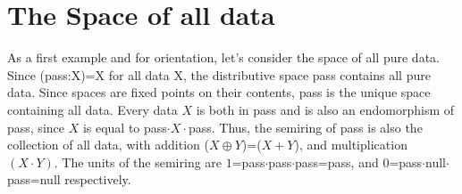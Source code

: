 \documentclass[11pt]{article}
\begin{document}
\section{The Space of all data} 

     As a first example and for orientation, let's consider the space of all pure data.  Since (pass:X)=X for all data X, the distributive space pass 
contains all pure data.  Since spaces are fixed points on their contents, pass is the unique space containing all data.  Every data $X$ is both in pass
and is also an endomorphism of pass, since $X$ is equal to pass$\cdot X\cdot$pass.  Thus, the semiring of pass is also the collection of all data, with 
addition ($X\oplus Y$)=($X+Y$), and multiplication $(X\cdot Y)$.  The units of the semiring are $1$=pass$\cdot$pass$\cdot$pass=pass, 
and $0$=pass$\cdot$null$\cdot$pass=null respectively.   
\end{document}

